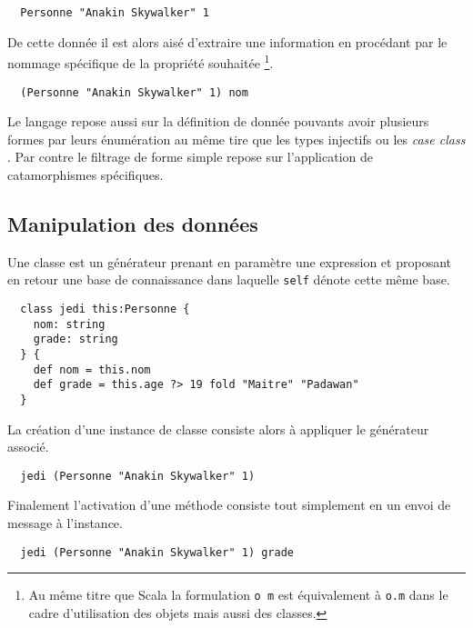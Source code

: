 \documentclass[twoside,a4paper]{article}
\begin{document}
\lstset{language=Thicket}
\begin{lstlisting}
  Personne "Anakin Skywalker" 1 
\end{lstlisting}

De  cette donnée  il  est  alors aisé  d'extraire  une information  en
procédant par le nommage spécifique de la propriété souhaitée 
\footnote{Au  même  titre que  Scala  la  formulation  {\tt o  m}  est
  équivalement à {\tt o.m} dans le cadre d'utilisation des objets mais
  aussi des classes.}.

\lstset{language=Thicket}
\begin{lstlisting}
  (Personne "Anakin Skywalker" 1) nom
\end{lstlisting}


Le langage  repose aussi  sur la définition  de donnée  pouvants avoir
plusieurs  formes par  leurs énumération  au même  tire que  les types
injectifs  \cite{ocaml}   \cite{haskell}  ou  les  {\it   case  class}
\cite{scala}.   Par contre  le  filtrage de  forme  simple repose  sur
l'application de catamorphismes \cite{catamorphismes} spécifiques.

\subsection{Manipulation des données}

Une classe  est un générateur  prenant en paramètre une  expression et
proposant en retour une base  de connaissance dans laquelle {\tt self}
dénote cette même  base.

\lstset{language=Thicket}
\begin{lstlisting}
  class jedi this:Personne {
    nom: string
    grade: string
  } {
    def nom = this.nom
    def grade = this.age ?> 19 fold "Maitre" "Padawan"
  }
\end{lstlisting}

La création  d'une instance  de classe consiste  alors à  appliquer le
générateur associé.

\lstset{language=Thicket}
\begin{lstlisting}
  jedi (Personne "Anakin Skywalker" 1)
\end{lstlisting}

Finalement l'activation  d'une méthode consiste tout  simplement en un
envoi de message à l'instance.

\lstset{language=Thicket}
\begin{lstlisting}
  jedi (Personne "Anakin Skywalker" 1) grade
\end{lstlisting}
\end{document}
